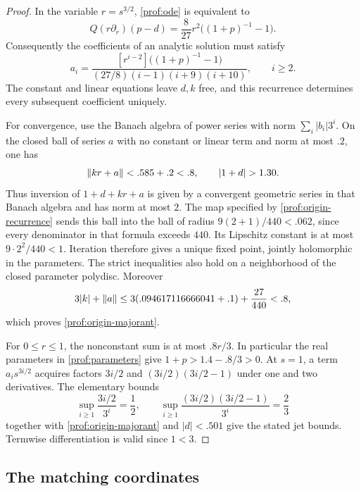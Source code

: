 \begin{proof}
In the variable $r=s^{3/2}$, \eqref{prof:ode} is equivalent to
\[
 Q(r\partial_r)(p-d)=\frac8{27}r^2\bigl((1+p)^{-1}-1\bigr).
\]
Consequently the coefficients of an analytic solution must satisfy
\begin{equation}\label{prof:origin-recurrence}
 a_i=
 \frac{[r^{i-2}]\bigl((1+p)^{-1}-1\bigr)}
 {(27/8)(i-1)(i+9)(i+10)},\qquad i\ge2.
\end{equation}
The constant and linear equations leave $d,k$ free, and this recurrence
determines every subsequent coefficient uniquely.

For convergence, use the Banach algebra of power series with norm
$\sum_i|b_i|3^i$.  On the closed ball of series $a$ with no constant or
linear term and norm at most $.2$, one has
\[
 \norm{kr+a}<.585+.2<.8,\qquad |1+d|>1.30.
\]
Thus inversion of $1+d+kr+a$ is given by a convergent geometric series
in that Banach algebra and has norm at most $2$.  The map specified by
\eqref{prof:origin-recurrence} sends this ball into the ball of radius
$9(2+1)/440<.062$, since every denominator in that formula exceeds $440$.
Its Lipschitz constant is at most $9\cdot 2^2/440<1$.  Iteration therefore
gives a unique fixed point, jointly holomorphic in the parameters.  The
strict inequalities also hold on a neighborhood of the closed parameter
polydisc.  Moreover
\[
 3|k|+\lVert a\rVert
 \le 3(.094617116666041+.1)+\frac{27}{440}<.8,
\]
which proves \eqref{prof:origin-majorant}.

For $0\le r\le1$, the nonconstant sum is at most $.8r/3$.  In particular
the real parameters in \eqref{prof:parameters} give $1+p>1.4-.8/3>0$.
At $s=1$, a term $a_is^{3i/2}$ acquires factors $3i/2$ and
$(3i/2)(3i/2-1)$ under one and two derivatives.  The elementary bounds
\[
 \sup_{i\ge1}\frac{3i/2}{3^i}=\frac12,
 \qquad
 \sup_{i\ge1}\frac{(3i/2)(3i/2-1)}{3^i}=\frac23
\]
together with \eqref{prof:origin-majorant} and $|d|<.501$ give the stated
jet bounds.  Termwise differentiation is valid since $1<3$.
\end{proof}

\subsection{The matching coordinates}

